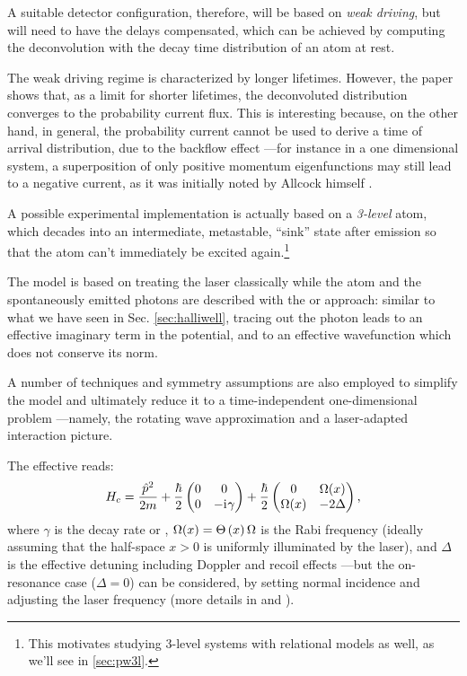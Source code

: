 A suitable detector configuration, therefore, will be based on \emph{weak driving},
but will need to have the delays compensated,
which can be achieved
by computing the
deconvolution with the decay time distribution of an atom at rest.

The weak driving regime is characterized by longer lifetimes.
However, the paper shows that,
as a limit for shorter lifetimes,
the deconvoluted distribution converges
to
the probability current flux.
This is interesting because, on the other hand, in general,
the probability current cannot be used to derive a time of arrival
distribution, due to the backflow effect
---for instance in a one dimensional system, a superposition of only positive momentum eigenfunctions may still lead to a
negative current, as it was initially noted by Allcock himself \parencite{Allcock-3}.

A possible experimental implementation is actually based on a \emph{3-level} atom,
which decades into an intermediate, metastable, 
``sink'' state after emission \parencite{Metastable, TQM2} so 
that the atom can't immediately be excited again.\footnote{
  This motivates studying 3-level systems with
  relational models as well, as we'll see in \ref{sec:pw3l}.
}

The model is based on treating the laser classically
while the atom and the spontaneously emitted photons are
described with the  or 
approach: similar to what we have seen in Sec. \ref{sec:halliwell},
tracing out the photon leads to an effective
imaginary term in the potential, and to an effective
wavefunction which does not conserve its norm.

A number of techniques and symmetry assumptions are also employed
to simplify the model and ultimately reduce it
to a time-independent one-dimensional problem
---namely,
the rotating wave approximation
and
a laser-adapted interaction picture.

The effective  reads:
\begin{equation}\label{eq:eff_atom_laser_detect_H}
  {H}_{c} = \frac{\hat{p}^2}{2m} +
  \frac{\hbar}{2} \left(
    \begin{matrix}
      0 & 0\\
      0 & -\iu\gamma
    \end{matrix}
  \right)
  +
  \frac{\hbar}{2} \left(
    \begin{matrix}%
      0         & \Omega(x)\\
      \Omega(x) & -2\Delta
    \end{matrix}
  \right)
  \text{,}
\end{equation}
where $\gamma$ is the decay rate or ,
$\Omega(x) = \Theta\left(x\right)\Omega$ is the Rabi frequency (ideally assuming that the half-space $x>0$ is uniformly illuminated by the laser),
and $\Delta$ is the effective detuning including Doppler and recoil effects
---but the on-resonance case ($\Delta=0$) can be considered,
by setting normal incidence and adjusting the laser frequency
(more details in \cite{Damborenea} and \cite[]{TQM2}).

